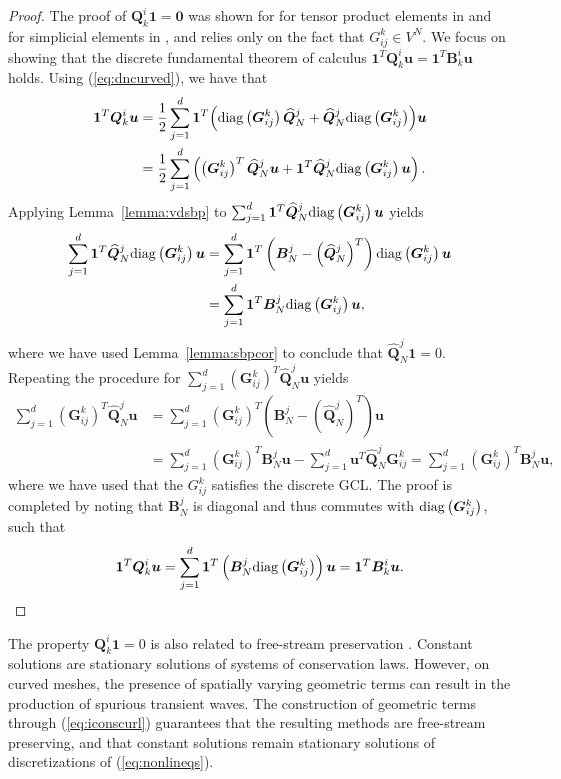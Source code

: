 \documentclass[review]{siamart0216}
\theoremstyle{assumption}
\renewcommand{\hat}[1]{\hat{#1}}
\newcommand{\LRp}[1]{\left( #1 \right)}
\renewcommand{\hat}{\widehat}
\newcommand{\diag}[1]{{\rm diag}\LRp{#1}}
\begin{document}
\begin{proof}
The proof of $\bm{Q}^i_k\bm{1} = \bm{0}$ was shown for for tensor product elements in \cite{kopriva2006metric} and for simplicial elements in \cite{chan2018discretely}, and relies only on the fact that $G^k_{ij} \in V^N$.  We focus on showing that the discrete fundamental theorem of calculus $\bm{1}^T\bm{Q}^i_k\bm{u} = \bm{1}^T\bm{B}^i_k\bm{u}$ holds.  Using (\ref{eq:dncurved}), we have that
\begin{align*}
\bm{1}^T\bm{Q}^i_k\bm{u} &= \frac{1}{2}\sum_{j=1}^d \bm{1}^T{\LRp{\diag{\bm{G}^k_{ij}}\hat{\bm{Q}}^j_N + \hat{\bm{Q}}^j_N\diag{\bm{G}^k_{ij}}}} \bm{u} \\
&= \frac{1}{2}\sum_{j=1}^d \LRp{\LRp{\bm{G}^k_{ij}}^T \hat{\bm{Q}}^j_N\bm{u} + \bm{1}^T\hat{\bm{Q}}^j_N\diag{\bm{G}^k_{ij}}\bm{u}}.
\end{align*}
Applying Lemma~\ref{lemma:vdsbp} to $\sum_{j=1}^d\bm{1}^T\hat{\bm{Q}}^j_N\diag{\bm{G}^k_{ij}}\bm{u}$ yields
\begin{align*}
\sum_{j=1}^d\bm{1}^T\hat{\bm{Q}}^j_N\diag{\bm{G}^k_{ij}}\bm{u} &= \sum_{j=1}^d\bm{1}^T\LRp{\bm{B}^j_N - \LRp{\hat{\bm{Q}}^j_N}^T}\diag{\bm{G}^k_{ij}}\bm{u} \\
&= \sum_{j=1}^d\bm{1}^T\bm{B}^j_N \diag{\bm{G}^k_{ij}}\bm{u},
\end{align*}
where we have used Lemma~\ref{lemma:sbpcor} to conclude that $\hat{\bm{Q}}^j_N \bm{1} = 0$.
Repeating the procedure for $\sum_{j=1}^d \LRp{\bm{G}^k_{ij}}^T \hat{\bm{Q}}^j_N\bm{u}$ yields
\begin{align*}
\sum_{j=1}^d \LRp{\bm{G}^k_{ij}}^T \hat{\bm{Q}}^j_N\bm{u} &= \sum_{j=1}^d \LRp{\bm{G}^k_{ij}}^T \LRp{\bm{B}^j_N - \LRp{\hat{\bm{Q}}^j_N}^T}\bm{u} \\
&= \sum_{j=1}^d \LRp{\bm{G}^k_{ij}}^T \bm{B}^j_N \bm{u} - \sum_{j=1}^d \bm{u}^T{\hat{\bm{Q}}^j_N}{\bm{G}^k_{ij}} = \sum_{j=1}^d \LRp{\bm{G}^k_{ij}}^T \bm{B}^j_N \bm{u},  
\end{align*}
where we have used that the $G^k_{ij}$ satisfies the discrete GCL.  The proof is completed by noting that $\bm{B}^j_N$ is diagonal and thus commutes with $\diag{\bm{G}^k_{ij}}$, such that
\[
\bm{1}^T\bm{Q}^i_k\bm{u} = \sum_{j=1}^d\bm{1}^T\LRp{\bm{B}^j_N \diag{\bm{G}^k_{ij}}}\bm{u} = \bm{1}^T\bm{B}^i_k \bm{u}.
\]
\end{proof}

The property $\bm{Q}^i_k\bm{1} = 0$ is also related to free-stream preservation \cite{kopriva2006metric}.  Constant solutions are stationary solutions of systems of conservation laws.  However, on curved meshes, the presence of spatially varying geometric terms can result in the production of spurious transient waves.  The construction of geometric terms through (\ref{eq:iconscurl}) guarantees that the resulting methods are free-stream preserving, and that constant solutions remain stationary solutions of discretizations of (\ref{eq:nonlineqs}).
\end{document}
